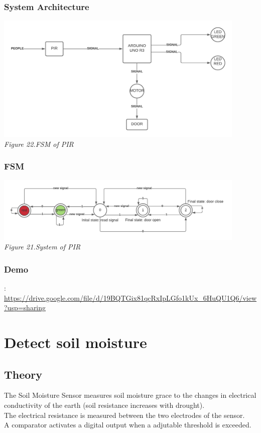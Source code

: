 \documentclass[a4paper]{article}
\begin{document}
\subsubsection{System Architecture}
\medskip
\begin{center}
    \includegraphics[width=12cm]{pictures/SA_PIR.png}\\
    \textit{Figure 22.FSM of PIR}\\
\end{center}
\medskip
\subsubsection{FSM}
\medskip
\begin{center}
    \includegraphics[width=12cm]{pictures/fsm_pir.png}\\
    \textit{Figure 21.System of PIR}\\
\end{center}
\medskip
\subsubsection{Demo}
\text{[Source]}:\\
\url{https://drive.google.com/file/d/19BQTGix81qcRxIpLGfo1kUx_6HuQU1Q6/view?usp=sharing}

\newpage
\section{Detect soil moisture}
\subsection{Theory}
The Soil Moisture Sensor measures soil moisture grace to the changes in electrical conductivity of the earth (soil resistance increases with drought).\bigskip\\
The electrical resistance is measured between the two electrodes of the sensor.\bigskip\\
A comparator activates a digital output when a adjutable threshold is exceeded.
\end{document}
